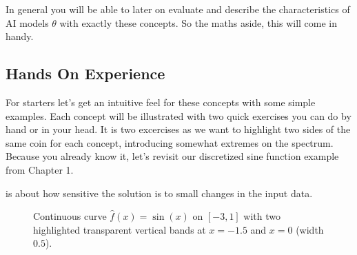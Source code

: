 
In general you will be able to later on evaluate and describe the characteristics of AI models $\theta$ with exactly these concepts.
So the maths aside, this will come in handy.






\newpage
\subsection{Hands On Experience}


For starters let's get an intuitive feel for these concepts with some simple examples.
Each concept will be illustrated with two quick exercises you can do by hand or in your head. 
It is two excercises as we want to highlight two sides of the same coin for each concept, introducing somewhat extremes on the spectrum.
Because you already know it, let's revisit our discretized sine function example from Chapter 1.




 is about how sensitive the solution is to small changes in the input data.

\begin{figure}[h]
    \centering
    \caption{Continuous curve $\hat{f}(x) = \sin(x)$ on $[-3,1]$ with two highlighted transparent vertical bands at $x=-1.5$ and $x=0$ (width $0.5$).}
    \label{fig:conditioning_bands}
\end{figure}

